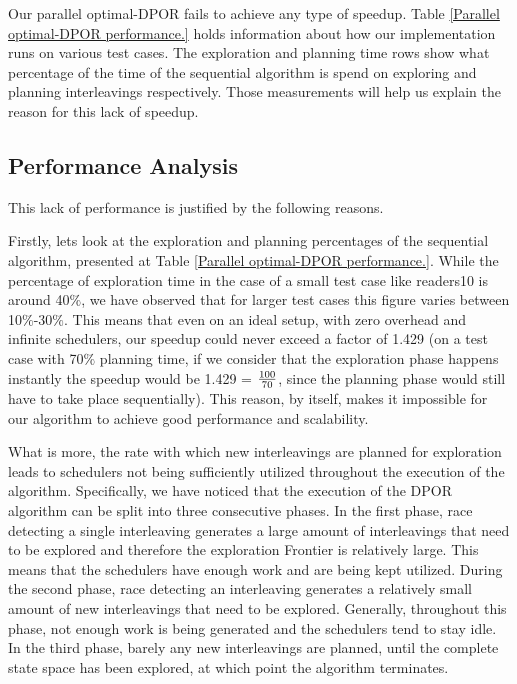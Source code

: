 Our parallel optimal-DPOR fails to achieve any type of speedup. Table \ref{Parallel optimal-DPOR performance.}
holds information about how our implementation runs on various test cases. The exploration and planning
time rows show what percentage of the time of the sequential algorithm is spend on exploring and planning interleavings respectively.
Those measurements will help us explain the reason for this lack of speedup.




\subsection{Performance Analysis}

This lack of performance is justified by the following reasons.

Firstly, lets look at the exploration and planning percentages of the sequential algorithm,
presented at Table \ref{Parallel optimal-DPOR performance.}. While the percentage of exploration time in the case of a small test
case like readers10 is around 40$\%$, we have observed that for larger test cases this figure varies between 10$\%$-30$\%$. 
This means that even on an ideal setup, with zero overhead and infinite schedulers, our speedup could never exceed a factor
of 1.429 (on a test case with 70$\%$ planning time, if we consider that the exploration phase happens instantly the 
speedup would be 1.429 = $100\over 70$, since the planning phase would still have to take place sequentially). 
This reason, by itself, makes it impossible for our algorithm to achieve good performance and scalability.

What is more, the rate with which new interleavings are planned for exploration leads to schedulers not being sufficiently utilized throughout the execution of the algorithm. Specifically, we have noticed that the execution of the DPOR algorithm can be split into three consecutive phases. In the first phase, race detecting a single interleaving generates a large amount of interleavings that need to be explored and therefore the exploration Frontier is relatively large. This means that the schedulers have enough work and are being kept utilized. During the second phase, race detecting an interleaving generates a relatively small amount of new interleavings that need to be explored. Generally, throughout this phase, not enough work is being generated and the schedulers tend to stay idle. In the third phase,
barely any new interleavings are planned, until the complete state space has been explored, at which point the algorithm terminates. 

